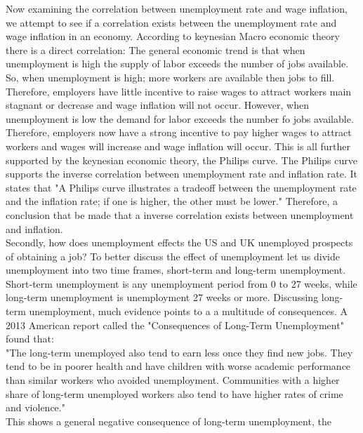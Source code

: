 Now examining the correlation between unemployment rate and wage inflation, we attempt to see if a correlation exists between the unemployment rate and wage inflation in an economy.
According to keynesian Macro economic theory there is a direct correlation:
The general economic trend is that when unemployment is high the supply of labor exceeds the number of jobs available.
So, when unemployment is high; more workers are available then jobs to fill.
Therefore, employers have little incentive to raise wages to attract workers main stagnant or decrease and wage inflation will not occur.
However, when unemployment is low the demand for labor exceeds the number fo jobs available. 
Therefore, employers now have a strong incentive to pay higher wages to attract workers and wages will increase and wage inflation will occur.\cite{Economics_Unemployment_Inflation}
This is all further supported by the keynesian economic theory, the Philips curve.
The Philips curve supports the inverse correlation between unemployment rate and inflation rate.
It states that "A Philips curve illustrates a tradeoff between the unemployment rate and the inflation rate; if one is higher, the other must be lower." \cite{Economics_Philips_Curve}
Therefore, a conclusion that be made that a inverse correlation exists between unemployment and inflation. \\

Secondly, how does unemployment effects the US and UK unemployed prospects of obtaining a job?
To better discuss the effect of unemployment let us divide unemployment into two time frames, short-term and long-term unemployment.
Short-term unemployment is any unemployment period from 0 to 27 weeks, while long-term unemployment is unemployment 27 weeks or more.
Discussing long-term unemployment, much evidence points to a a multitude of consequences.
A 2013 American report called the "Consequences of Long-Term Unemployment" found that: \\

"The long-term unemployed also tend to earn less once they find new jobs. 
They tend to be in poorer health and have children with worse academic performance than similar workers who avoided unemployment. 
Communities with a higher share of long-term unemployed workers also tend to have higher rates of crime and violence."\cite{Long-term_Unemployment_report}\\

This shows a general negative consequence of long-term unemployment, the

